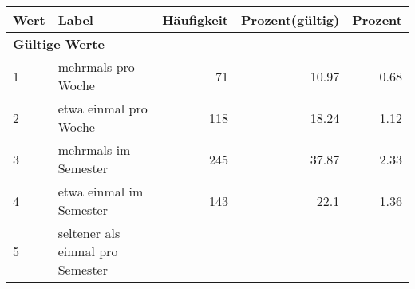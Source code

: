      \begin{longtable}{lXrrr}
     \toprule
     \textbf{Wert} & \textbf{Label} & \textbf{Häufigkeit} & \textbf{Prozent(gültig)} & \textbf{Prozent} \\
     \endhead
     \midrule
     \multicolumn{5}{l}{\textbf{Gültige Werte}}\\

     1 &
     \multicolumn{1}{X}{ mehrmals pro Woche   } &


       \num{71} &
       \num[round-mode=places,round-precision=2]{10.97} &
         \num[round-mode=places,round-precision=2]{0.68} \\

     2 &
     \multicolumn{1}{X}{ etwa einmal pro Woche   } &


       \num{118} &
       \num[round-mode=places,round-precision=2]{18.24} &
         \num[round-mode=places,round-precision=2]{1.12} \\

     3 &
     \multicolumn{1}{X}{ mehrmals im Semester   } &


       \num{245} &
       \num[round-mode=places,round-precision=2]{37.87} &
         \num[round-mode=places,round-precision=2]{2.33} \\

     4 &
     \multicolumn{1}{X}{ etwa einmal im Semester   } &


       \num{143} &
       \num[round-mode=places,round-precision=2]{22.1} &
         \num[round-mode=places,round-precision=2]{1.36} \\

     5 &
     \multicolumn{1}{X}{ seltener als einmal pro Semester   } &



\end{longtable}
